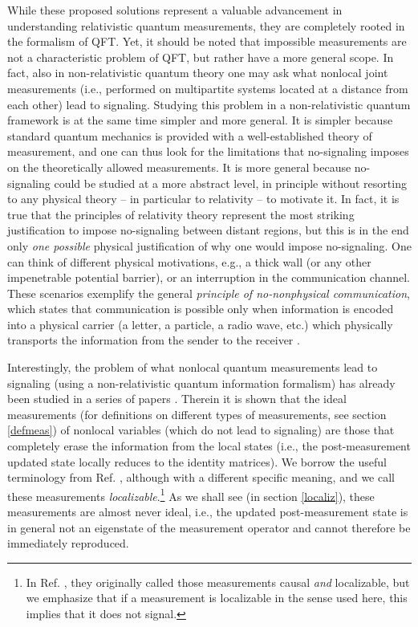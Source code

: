 \documentclass[12pt]{article}
\begin{document}
While these proposed solutions represent a valuable advancement in  understanding  relativistic quantum measurements, they are completely rooted in the formalism of QFT. Yet, it should be noted that impossible measurements are not a characteristic problem of QFT, but rather have a more general scope. In fact, also in non-relativistic quantum theory one may ask what nonlocal joint measurements (i.e., performed on multipartite systems located at a distance from each other) lead to signaling. Studying this problem in a non-relativistic quantum framework is at the same time  simpler and  more general. It is simpler because standard quantum mechanics is provided with a well-established theory of measurement, and one can thus look for the limitations that no-signaling imposes on the theoretically allowed measurements. It is more general because no-signaling could be studied at a more abstract level, in principle without resorting to any physical theory -- in particular to relativity -- to motivate it. In fact, it is true that the principles of  relativity theory represent the most striking justification to impose no-signaling between distant regions, but this is in the end only \textit{one possible} physical justification of why one would impose no-signaling. One can think of different physical motivations, e.g., a thick wall (or any other impenetrable potential barrier), or an interruption in the communication channel. These scenarios exemplify the general \textit{principle of no-nonphysical communication}, which states that communication is possible only when information is encoded into a physical carrier (a letter, a particle, a radio wave, etc.) which physically transports the information from the sender to the receiver \cite{gisin2014quantum}.

Interestingly, the problem of what nonlocal quantum measurements lead to signaling (using a non-relativistic quantum information formalism) has    already been studied in a series of papers \cite{aharonov1986measurement, popescu1994causality, groisman2001nonlocal, groisman2002measurements, vaidman2003instantaneous, groisman2003instantaneous, clark2010entanglement,  beigi2011simplified, gonzales2019bounds}. Therein  it is shown that the ideal measurements (for definitions on different types of measurements, see section \ref{defmeas}) of nonlocal variables (which do not lead to signaling) are those that completely erase the information from the local states (i.e., the post-measurement updated state locally reduces to the identity matrices). We borrow the useful terminology from Ref. \cite{beckman2001causal}, although with a different specific meaning, and we call these measurements \textit{localizable}.\footnote{In Ref. \cite{beckman2001causal}, they originally called those measurements causal \textit{and} localizable, but we emphasize that if a measurement is localizable in the sense used here, this implies that it does not signal.} As we shall see (in section \ref{localiz}), these measurements are almost never ideal, i.e., the updated post-measurement state is in general not an eigenstate of the measurement operator and cannot therefore be immediately reproduced. 
\end{document}
